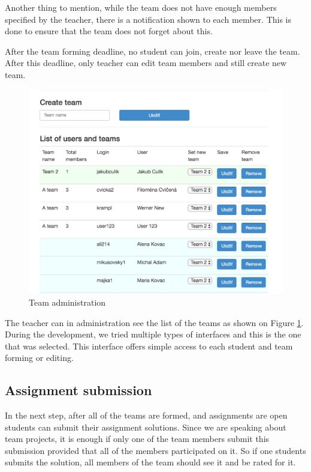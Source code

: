 Another thing to mention, while the team does not have enough members specified by the teacher, there is a notification shown to each member. This is done to ensure that the team does not forget about this.

After the team forming deadline, no student can join, create nor leave the team. After this deadline, only teacher can edit team members and still create new team. 

\begin{figure}[h]
    \centering
    \includegraphics[width=\textwidth]{images/teamadmin.png}
    \caption{Team administration}
    \label{team_forming}
\end{figure}

The teacher can in administration see the list of the teams as shown on Figure \ref{team_forming}. During the development, we tried multiple types of interfaces and this is the one that was selected. This interface offers simple access to each student and team forming or editing.


\subsection{Assignment submission}
In the next step, after all of the teams are formed, and assignments are open students can submit their assignment solutions. Since we are speaking about team projects, it is enough if only one of the team members submit this submission provided that all of the members participated on it. So if one students submits the solution, all members of the team should see it and be rated for it.

